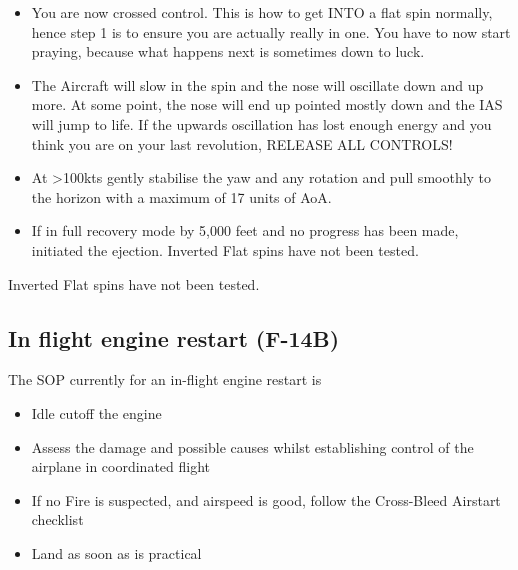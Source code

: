 \begin{itemize}
  \item You are now crossed control. This is how to get INTO a flat spin
    normally, hence step 1 is to ensure you are actually really in one. You
    have to now start praying, because what happens next is sometimes down to
    luck.

  \item The Aircraft will slow in the spin and the nose will oscillate down and
    up more. At some point, the nose will end up pointed mostly down and the
    IAS will jump to life. If the upwards oscillation has lost enough energy
    and you think you are on your last revolution, RELEASE ALL CONTROLS!

  \item At >100kts gently stabilise the yaw and any rotation and pull smoothly
    to the horizon with a maximum of 17 units of AoA.

  \item If in full recovery mode by 5,000 feet and no progress has been made,
    initiated the ejection. Inverted Flat spins have not been tested.

\end{itemize}

Inverted Flat spins have not been tested.

\newpage

\subsection{In flight engine restart (F-14B)}

The SOP currently for an in-flight engine restart is

\begin{itemize}

  \item Idle cutoff the engine

  \item Assess the damage and possible causes whilst establishing control of
    the airplane in coordinated flight

  \item If no Fire is suspected, and airspeed is good, follow the Cross-Bleed
    Airstart checklist


  \item Land as soon as is practical

\end{itemize}

